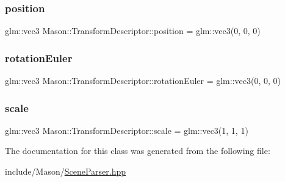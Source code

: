 \subsubsection{\texorpdfstring{position}{position}}
{\footnotesize\ttfamily glm\+::vec3 Mason\+::\+Transform\+Descriptor\+::position = glm\+::vec3(0, 0, 0)}

\hypertarget{class_mason_1_1_transform_descriptor_aa66cc703fd520b19b4347b390eabfc41}{}\label{class_mason_1_1_transform_descriptor_aa66cc703fd520b19b4347b390eabfc41} 
\subsubsection{\texorpdfstring{rotation\+Euler}{rotationEuler}}
{\footnotesize\ttfamily glm\+::vec3 Mason\+::\+Transform\+Descriptor\+::rotation\+Euler = glm\+::vec3(0, 0, 0)}

\hypertarget{class_mason_1_1_transform_descriptor_a5d264880a0c22c624c996057bf59b752}{}\label{class_mason_1_1_transform_descriptor_a5d264880a0c22c624c996057bf59b752} 
\subsubsection{\texorpdfstring{scale}{scale}}
{\footnotesize\ttfamily glm\+::vec3 Mason\+::\+Transform\+Descriptor\+::scale = glm\+::vec3(1, 1, 1)}



The documentation for this class was generated from the following file\+:\begin{DoxyCompactItemize}
\item 
include/\+Mason/\hyperlink{_scene_parser_8hpp}{Scene\+Parser.\+hpp}\end{DoxyCompactItemize}
